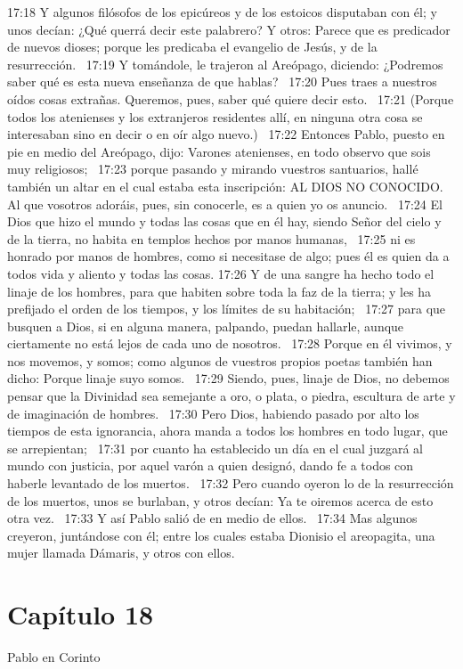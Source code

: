 17:18 Y algunos filósofos de los epicúreos y de los estoicos disputaban con él; y unos decían: ¿Qué querrá decir este palabrero? Y otros: Parece que es predicador de nuevos dioses; porque les predicaba el evangelio de Jesús, y de la resurrección.  
17:19 Y tomándole, le trajeron al Areópago, diciendo: ¿Podremos saber qué es esta nueva enseñanza de que hablas?  
17:20 Pues traes a nuestros oídos cosas extrañas. Queremos, pues, saber qué quiere decir esto.  
17:21 (Porque todos los atenienses y los extranjeros residentes allí, en ninguna otra cosa se interesaban sino en decir o en oír algo nuevo.)  
17:22 Entonces Pablo, puesto en pie en medio del Areópago, dijo: Varones atenienses, en todo observo que sois muy religiosos;  
17:23 porque pasando y mirando vuestros santuarios, hallé también un altar en el cual estaba esta inscripción: AL DIOS NO CONOCIDO. Al que vosotros adoráis, pues, sin conocerle, es a quien yo os anuncio.  
17:24 El Dios que hizo el mundo y todas las cosas que en él hay, siendo Señor del cielo y de la tierra, no habita en templos hechos por manos humanas,  
17:25 ni es honrado por manos de hombres, como si necesitase de algo; pues él es quien da a todos vida y aliento y todas las cosas. 
17:26 Y de una sangre ha hecho todo el linaje de los hombres, para que habiten sobre toda la faz de la tierra; y les ha prefijado el orden de los tiempos, y los límites de su habitación;  
17:27 para que busquen a Dios, si en alguna manera, palpando, puedan hallarle, aunque ciertamente no está lejos de cada uno de nosotros.  
17:28 Porque en él vivimos, y nos movemos, y somos; como algunos de vuestros propios poetas también han dicho: Porque linaje suyo somos.  
17:29 Siendo, pues, linaje de Dios, no debemos pensar que la Divinidad sea semejante a oro, o plata, o piedra, escultura de arte y de imaginación de hombres.  
17:30 Pero Dios, habiendo pasado por alto los tiempos de esta ignorancia, ahora manda a todos los hombres en todo lugar, que se arrepientan;  
17:31 por cuanto ha establecido un día en el cual juzgará al mundo con justicia, por aquel varón a quien designó, dando fe a todos con haberle levantado de los muertos.  
17:32 Pero cuando oyeron lo de la resurrección de los muertos, unos se burlaban, y otros decían: Ya te oiremos acerca de esto otra vez.  
17:33 Y así Pablo salió de en medio de ellos.  
17:34 Mas algunos creyeron, juntándose con él; entre los cuales estaba Dionisio el areopagita, una mujer llamada Dámaris, y otros con ellos.  
\section*{Capítulo 18 }
Pablo en Corinto  

